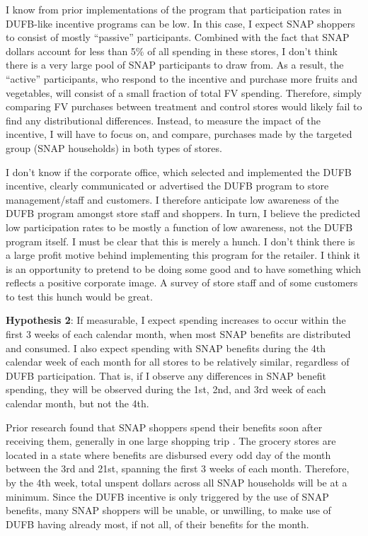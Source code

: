 \documentclass[12pt,letterpaperpaper,]{book}
\begin{document}
I know from prior implementations of the program that participation
rates in DUFB-like incentive programs can be low. In this case, I expect
SNAP shoppers to consist of mostly ``passive'' participants. Combined
with the fact that SNAP dollars account for less than 5\% of all
spending in these stores, I don't think there is a very large pool of
SNAP participants to draw from. As a result, the ``active''
participants, who respond to the incentive and purchase more fruits and
vegetables, will consist of a small fraction of total FV spending.
Therefore, simply comparing FV purchases between treatment and control
stores would likely fail to find any distributional differences.
Instead, to measure the impact of the incentive, I will have to focus
on, and compare, purchases made by the targeted group (SNAP households)
in both types of stores.

I don't know if the corporate office, which selected and implemented the
DUFB incentive, clearly communicated or advertised the DUFB program to
store management/staff and customers. I therefore anticipate low
awareness of the DUFB program amongst store staff and shoppers. In turn,
I believe the predicted low participation rates to be mostly a function
of low awareness, not the DUFB program itself. I must be clear that this
is merely a hunch. I don't think there is a large profit motive behind
implementing this program for the retailer. I think it is an opportunity
to pretend to be doing some good and to have something which reflects a
positive corporate image. A survey of store staff and of some customers
to test this hunch would be great.

\textbf{Hypothesis 2}: If measurable, I expect spending increases to
occur within the first 3 weeks of each calendar month, when most SNAP
benefits are distributed and consumed. I also expect spending with SNAP
benefits during the 4th calendar week of each month for all stores to be
relatively similar, regardless of DUFB participation. That is, if I
observe any differences in SNAP benefit spending, they will be observed
during the 1st, 2nd, and 3rd week of each calendar month, but not the
4th.

Prior research found that SNAP shoppers spend their benefits soon after
receiving them, generally in one large shopping trip
\citep{wiig_art_2009, damon_first_2013}. The grocery stores are located
in a state where benefits are disbursed every odd day of the month
between the 3rd and 21st, spanning the first 3 weeks of each month.
Therefore, by the 4th week, total unspent dollars across all SNAP
households will be at a minimum. Since the DUFB incentive is only
triggered by the use of SNAP benefits, many SNAP shoppers will be
unable, or unwilling, to make use of DUFB having already most, if not
all, of their benefits for the month.
\end{document}
